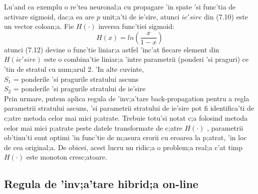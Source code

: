 \par
Lu'and ca exemplu o re'tea neuronal;a cu propagare 'in spate 'si func'tia de activare sigmoid, dac;a ea are $p$ unit;a'ti de ie'sire, atunci $ie'sire$ din (7.10) este un vector coloan;a. Fie $H(\cdot)$ inversa func'tiei sigmoid:
\begin{equation}
H(x) = ln (\frac {x} {1-x})
\end{equation}
atunci (7.12) devine o func'tie liniar;a astfel 'inc'at fiecare element din $H(ie'sire)$ este o combina'tie liniar;a 'intre parametrii (ponderi 'si praguri) ce 'tin de stratul cu num;arul 2. 'In alte cuvinte, \\
$S_{1}$ =  ponderile 'si pragurile stratului ascuns \\
$S_{2}$ = ponderile 'si pragurile stratului de ie'sire \\
Prin urmare, putem aplica regula de 'inv;a'tare back-propagation pentru a regla parametrii stratului ascuns, 'si parametrii stratului de ie'sire pot fi identifica'ti de c;atre metoda celor mai mici p;atrate. Trebuie totu'si notat c;a folosind metoda celor mai mici p;atrate peste datele transformate de c;atre $H(\cdot)$ , parametrii ob'tinu'ti sunt optimi 'in func'tie de m;asura erorii cu eroarea la p;atrat, 'in loc de cea original;a. De obicei, acest lucru nu ridic;a o problem;a real;a c'at timp $H(\cdot)$ este monoton cresc;atoare.
\par

\subsection{Regula de 'inv;a'tare hibrid;a on-line}
\paragraph{}

